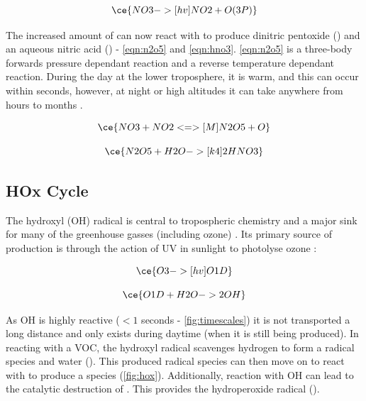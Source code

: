 \begin{equation}
  \ce{NO3 ->[hv] NO2 + O(3P)}
  \label{eqn:nno3}
\end{equation}


 The increased amount of  can now react with  to produce dinitric pentoxide () and an aqueous nitric acid () - \autoref{eqn:n2o5} and \autoref{eqn:hno3}. \autoref{eqn:n2o5} is a three-body forwards pressure dependant reaction and a reverse temperature dependant reaction. During the day at the lower troposphere, it is warm, and this can occur within seconds, however, at night or high altitudes it can take anywhere from hours to months \citep{fundamentals}.


\begin{equation}
  \ce{NO3 + NO2 <=>[M] N2O5 + O}
  \label{eqn:n2o5}
\end{equation}

\begin{equation}
  \ce{N2O5 + H2O ->[k4] 2HNO3}
  \label{eqn:hno3}
\end{equation}



\subsection{HOx Cycle}
The hydroxyl (OH) radical is central to tropospheric chemistry and a major sink for many of the greenhouse gasses (including ozone) \citep{olson}. Its primary source of production is through the action of UV in sunlight to photolyse ozone \citep{fundamentals}:


\begin{equation}
  \ce{O3 ->[hv] O1D}
\end{equation}

\begin{equation}
  \ce{O1D + H2O -> 2OH}
\end{equation}

As OH is highly reactive ($<1$ seconds - \autoref{fig:timescales}) it is not transported a long distance and only exists during daytime (when it is still being produced). In reacting with a VOC, the hydroxyl radical scavenges hydrogen to form a radical species and water (). This produced radical species can then move on to react with  to produce a  species (\autoref{fig:hox}). Additionally, reaction with OH can lead to the catalytic destruction of . This provides the hydroperoxide radical (). 

